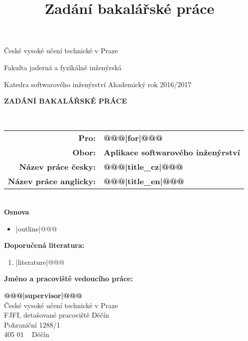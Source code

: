 \documentclass[a4paper,11pt,twoside,final]{article}
\title{Zadání bakalářské práce}
\begin{document}
\begin{titlepage}

\begin{center}
  \begin{huge}
		České vysoké učení technické v Praze\par
		Fakulta jaderná a fyzikálně inženýrská
  \end{huge}
\end{center}

\vspace{5mm}
Katedra softwarového inženýrství \hfill     Akademický rok 2016/2017\\[2cm]

\begin{center}
  \begin{huge}
    \textbf{ZADÁNÍ BAKALÁŘSKÉ PRÁCE}
  \end{huge}
\\[2cm]
\end{center}


\begin{tabularx}{\textwidth}{rl}
\textbf{Pro:} & \textbf{@@@|for|@@@}\\[0.3cm]
\textbf{Obor:} & \textbf{Aplikace softwarového inženýrství}\\[0.3cm]
\textbf{Název práce česky:} & \textbf{@@@|title_cz|@@@}\\[0.3cm]
\textbf{Název práce anglicky:} & \textbf{@@@|title_en|@@@}
\end{tabularx}
\\[4cm]

\textbf{Osnova}

\vspace{5pt}
\begin{itemize}
@@@\item |outline|@@@
\end{itemize}

\newpage
\pagestyle{empty}

\textbf{Doporučená literatura:}

\leftmargini=13pt
\begin{enumerate}
@@@\item |literature|@@@
\end{enumerate}

\vfill
\textbf{Jméno a pracoviště vedoucího práce:}

\textbf{@@@|supervisor|@@@} \\
České vysoké učení technické v Praze\\
FJFI, detašované pracoviště Děčín\\
Pohraniční 1288/1\\
405 01 ~ Děčín\par
\hfill
\begin{minipage}{0.3\textwidth}


\end{minipage}
\end{titlepage}
\end{document}
